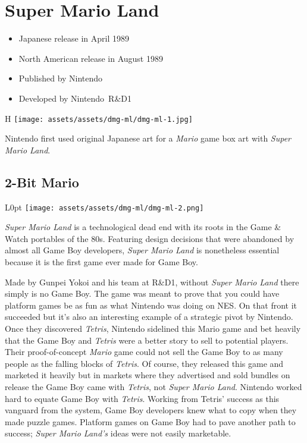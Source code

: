 \documentclass{book}
\begin{document}
\begingroup \chapter*{Super Mario Land} \endgroup

\begin{itemize} \setlength\itemsep{-0.4em}
\item Japanese release in April 1989
\item North American release in August 1989
\item Published by Nintendo
\item Developed by Nintendo R\&D1
\end{itemize}\noindent

\begin{wrapfigure}{H}{\linewidth}
\vskip 4pt
\centering \texttt{[image: assets/assets/dmg-ml/dmg-ml-1.jpg]}\par\pagetwodescription Nintendo first used original Japanese art for a \emph{Mario} game box art with \emph{Super Mario Land}.\end{wrapfigure}
\clearpage

\FloatBarrier\needspace{5pt}\section*{2-Bit Mario}\nopagebreak[4]

\begin{wrapfigure}{L}{0pt} \texttt{[image: assets/assets/dmg-ml/dmg-ml-2.png]}\end{wrapfigure}
\emph{Super Mario Land} is a technological dead end with its roots in the Game \& Watch portables of the 80s. Featuring design decisions that were abandoned by almost all Game Boy developers, \emph{Super Mario Land} is nonetheless essential because it is the first game ever made for Game Boy.

Made by Gunpei Yokoi and his team at R\&D1, without \emph{Super Mario Land} there simply is no Game Boy. The game was meant to prove that you could have platform games be as fun as what Nintendo was doing on NES. On that front it succeeded but it’s also an interesting example of a strategic pivot by Nintendo. Once they discovered \emph{Tetris}, Nintendo sidelined this Mario game and bet heavily that the Game Boy and \emph{Tetris} were a better story to sell to potential players. Their proof-of-concept \emph{Mario} game could not sell the Game Boy to as many people as the falling blocks of \emph{Tetris}. Of course, they released this game and marketed it heavily but in markets where they advertised and sold bundles on release the Game Boy came with \emph{Tetris}, not \emph{Super Mario Land}. Nintendo worked hard to equate Game Boy with \emph{Tetris}. Working from Tetris’ success as this vanguard from the system, Game Boy developers knew what to copy when they made puzzle games. Platform games on Game Boy had to pave another path to success; \emph{Super Mario Land’s} ideas were not easily marketable.
\end{document}
